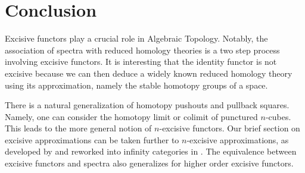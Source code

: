 \section{Conclusion}
Excisive functors play a crucial role in Algebraic Topology. Notably, the association of spectra with reduced homology theories is a two step process involving excisive functors. It is interesting that the identity functor is not excisive because we can then deduce a widely known reduced homology theory using its approximation, namely the stable homotopy groups of a space. 

There is a natural generalization of homotopy pushouts and pullback squares. Namely, one can consider the homotopy limit or colimit of punctured $n$-cubes. This leads to the more general notion of $n$-excisive functors. Our brief section on excisive approximations can be taken further to $n$-excisive approximations, as developed by \cite{GW3} and reworked into infinity categories in \cite{HA}. The equivalence between excisive functors and spectra also generalizes for higher order excisive functors. 
